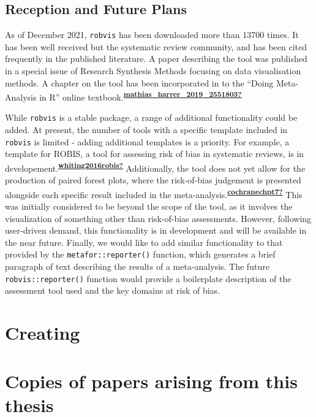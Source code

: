 \documentclass[a4paper, twoside]{templates/ociamthesis}
\newcommand*{\bibtitle}{Bibliography}
\begin{document}
\hypertarget{reception-and-future-plans-1}{%
\subsection{Reception and Future Plans}\label{reception-and-future-plans-1}}

As of December 2021, \texttt{robvis} has been downloaded more than 13700 times. It has been well received but the systematic review community, and has been cited frequently in the published literature. A paper describing the tool was published in a special issue of Research Synthesis Methods focusing on data visualisation methods. A chapter on the tool has been incorporated in to the ``Doing Meta-Analysis in R'' online textbook.\textsuperscript{\protect\hyperlink{ref-mathias_harrer_2019_2551803}{\textbf{mathias\_harrer\_2019\_2551803?}}}

While \texttt{robvis} is a stable package, a range of additional functionality could be added. At present, the number of tools with a specific template included in \texttt{robvis} is limited - adding additional templates is a priority. For example, a template for ROBIS, a tool for assessing risk of bias in systematic reviews, is in developement.\textsuperscript{\protect\hyperlink{ref-whiting2016robis}{\textbf{whiting2016robis?}}} Additionally, the tool does not yet allow for the production of paired forest plots, where the risk-of-bias judgement is presented alongside each specific result included in the meta-analysis.\textsuperscript{\protect\hyperlink{ref-cochranechpt7}{\textbf{cochranechpt7?}}} This was initially considered to be beyond the scope of the tool, as it involves the visualization of something other than risk-of-bias assessments. However, following user-driven demand, this functionality is in development and will be available in the near future. Finally, we would like to add similar functionality to that provided by the \texttt{metafor::reporter()} function, which generates a brief paragraph of text describing the results of a meta-analysis. The future \texttt{robvis::reporter()} function would provide a boilerplate description of the assessment tool used and the key domains at risk of bias.

\hypertarget{creating}{%
\section{Creating}\label{creating}}

\hypertarget{published-papers}{%
\section{Copies of papers arising from this thesis}\label{published-papers}}






\setlength{\baselineskip}{0pt} %

{\renewcommand*\MakeUppercase[1]{#1}%
\printbibliography[heading=bibintoc,title={\bibtitle}]}
\end{document}
